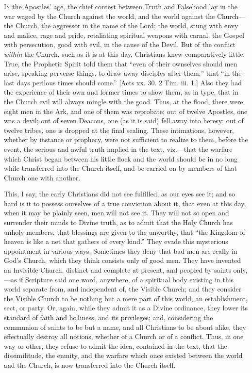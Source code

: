 I\textsc{n} the Apostles' age, the chief contest between Truth and
Falsehood lay in the war waged by the Church against the world, and
the world against the Church—the Church, the aggressor in the name
of the Lord; the world, stung with envy and malice, rage and pride,
retaliating spiritual weapons with carnal, the Gospel with
persecution, good with evil, in the cause of the Devil. But of the
conflict \emph{within} the Church, such as it is at this day,
Christians knew comparatively little. True, the Prophetic Spirit told
them that ``even of their ownselves should men arise, speaking
perverse things, to draw away disciples after them;'' that
``in the last days perilous times should come.'' [Acts xx. 30.
2 Tim. iii. 1.] Also they had the experience of their own and former
times to show them, as in type, that in the Church evil will always
mingle with the good. Thus, at the flood, there were eight men in the
Ark, and one of them was reprobate; out of twelve Apostles, one was a
devil; out of seven Deacons, one (as it is said) fell away into
heresy; out of twelve tribes, one is dropped at the final sealing.
These intimations, however, whether by instance or prophecy, were not
sufficient to realize to them, before the event, the serious and awful
truth implied in the text, viz.—that the warfare which Christ began
between his little flock and the world should be in no long while
transferred into the Church itself, and be carried on by members of
that Church one with another.

This, I say, the early Christians did not see fulfilled, as our
eyes see it; and so hard is it to possess ourselves of a true
conviction about it, that even at this day, when it may be plainly
seen, men will not see it. They will not so open and surrender their
minds to Divine truth, as to admit that the Holy Church has unholy
members, that blessings are given to the unworthy, that ``the
Kingdom of heaven is like a net that gathers of every kind.'' They
evade this mysterious appointment in various ways. Sometimes they deny
that bad men are really in God's Church, which they think consists
only of good men. They have invented an Invisible Church, distinct and
complete at present, and peopled by saints only,—as if Scripture
said one word, anywhere, of a spiritual body existing in this world
separate from, and independent of, the Visible Church; and they
consider the Visible Church to be nothing but a mere part of this
world, an establishment, sect, or party. Or, again, while they admit
it as a Divine ordinance, they lower its standard of faith and
ho1iness, and its privileges; and, considering the communion of saints
to be but a name, and all Christians to be about alike, they
effectually destroy all notions, whether of a Church or of a conflict.
Thus, in one way or other, they refuse to admit the idea, contained in
the text, that the dissimilitude, the enmity, and the warfare which
once existed between the world and the Church, is now transferred into
the Church itself.

